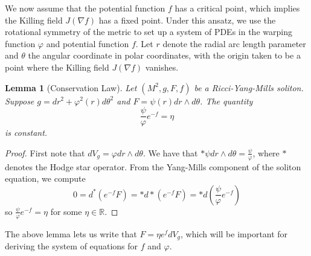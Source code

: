 \documentclass[12pt, a4paper, reqno, oneside]{amsart}
\newcommand{\R}{\mathbb{R}}
\renewcommand{\phi}{\varphi}
\newcommand{\dvol}{dV_{g}}
\numberwithin{equation}{section}
\theoremstyle{plain}
\newtheorem{lemma}[theorem]{Lemma}
\theoremstyle{definition}
\theoremstyle{plain}
\begin{document}
We now assume that the potential function $f$ has a critical point, which implies the Killing field $J(\nabla f)$ has a fixed point. Under this ansatz, we use the rotational symmetry of the metric to set up a system of PDEs in the warping function $\phi$ and potential function $f$. Let $r$ denote the radial arc length parameter and $\theta$ the angular coordinate in polar coordinates, with the origin taken to be a point where the Killing field $J(\nabla f)$ vanishes.

\begin{lemma}[Conservation Law]\label{YMSurfSolConserve1}
  Let $(M^{2}, g, F, f)$ be a Ricci-Yang-Mills soliton. Suppose $g=dr^{2}+\phi^{2}(r)d\theta^{2}$ and $F=\psi(r) dr\wedge d\theta$. The quantity
  \[
    \frac{\psi}{\phi}e^{-f} = \eta
  \]
  is constant.
\end{lemma}
\begin{proof}
  First note that $\dvol = \phi dr\wedge d\theta$. We have that $*\psi dr\wedge d\theta = \frac{\psi}{\phi}$, where $*$ denotes the Hodge star operator. From the Yang-Mills component of the soliton equation, we compute
  \[
    0 = d^{*}\left(e^{-f}F\right) = *d*\left(e^{-f}F\right)=*d\left(\frac{\psi}{\phi}e^{-f}\right)
  \]
  so $\frac{\psi}{\phi}e^{-f} = \eta$ for some $\eta\in\R$.
\end{proof}

The above lemma lets us write that $F=\eta e^{f}\dvol$, which will be important for deriving the system of equations for $f$ and $\varphi$.
\end{document}

